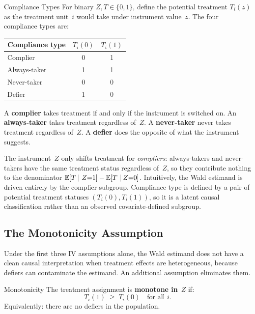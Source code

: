 \documentclass[master.tex]{subfiles}
\begin{document}
\begin{defn}{Compliance Types \citep{angrist1996identification}}
\label{w7:defn:compliance}
For binary $Z, T \in \{0,1\}$, define the potential treatment
$T_i(z)$ as the treatment unit~$i$ would take under instrument
value~$z$.  The four compliance types are:

\medskip
\begin{center}
\begin{tabular}{lcc}
  \toprule
  \textbf{Compliance type} & $T_i(0)$ & $T_i(1)$ \\
  \midrule
  Complier     & 0 & 1 \\
  Always-taker & 1 & 1 \\
  Never-taker  & 0 & 0 \\
  Defier       & 1 & 0 \\
  \bottomrule
\end{tabular}
\end{center}
\medskip

\noindent A \textbf{complier} takes treatment if and only if the
instrument is switched on.  An \textbf{always-taker} takes
treatment regardless of~$Z$.  A \textbf{never-taker} never takes
treatment regardless of~$Z$.  A \textbf{defier} does the opposite
of what the instrument suggests.
\end{defn}

The instrument~$Z$ only shifts treatment for \emph{compliers}:
always-takers and never-takers have the same treatment status
regardless of~$Z$, so they contribute nothing to the denominator
$\mathbb{E}[T \mid Z{=}1] - \mathbb{E}[T \mid Z{=}0]$.  Intuitively, the Wald
estimand is driven entirely by the complier subgroup.
Compliance type is defined by a pair of potential treatment statuses
$(T_i(0), T_i(1))$, so it is a latent causal classification rather
than an observed covariate-defined subgroup.

\subsection{The Monotonicity Assumption}

Under the first three IV assumptions alone, the Wald estimand does
not have a clean causal interpretation when treatment effects are
heterogeneous, because defiers can contaminate the estimand.  An
additional assumption eliminates them.

\begin{defn}{Monotonicity \citep{imbens1994identification}}
\label{w7:defn:monotonicity}
The treatment assignment is \textbf{monotone in}~$Z$ if:
\[
  T_i(1) \;\geq\; T_i(0) \quad \text{for all } i.
\]
Equivalently: there are no defiers in the population.
\end{defn}
\end{document}
